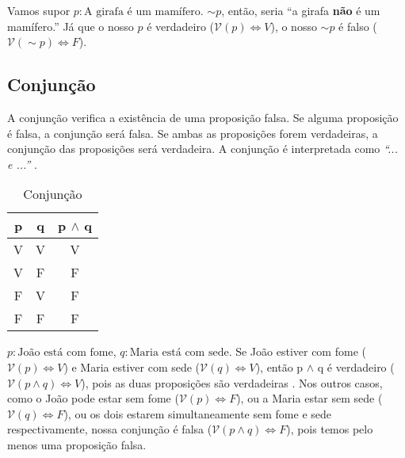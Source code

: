 \begin{exemplo}
Vamos supor $p: \text{A girafa é um mamífero}.$ $\sim p$, então, seria ``a girafa \textbf{não} é um mamífero.'' Já que o nosso $p$ é verdadeiro ($\mathcal{V}(p) \Leftrightarrow V$), o nosso $\sim p$ é falso ($\mathcal{V}(\sim p) \Leftrightarrow F$).
\end{exemplo}

\subsection*{Conjunção}
A conjunção verifica a existência de uma proposição falsa. Se alguma proposição é falsa, a conjunção será falsa. Se ambas as proposições forem verdadeiras, a conjunção das proposições será verdadeira. A conjunção é interpretada como \textit{``... e ...''} .
\begin{table}[H]
\centering
\caption{Conjunção}
\label{and}
\begin{tabular}{c|c|c}
\textbf{p} & \textbf{q} & \textbf{p $\wedge$ q} \\ \hline
V          & V          & V             \\
V          & F          & F             \\
F          & V          & F             \\
F          & F          & F            
\end{tabular}
\end{table}

\begin{exemplo}
$p:\text{João está com fome}$, $q:\text{Maria está com sede}$. Se João estiver com fome ($\mathcal{V}(p) \Leftrightarrow V$) e Maria estiver com sede ($\mathcal{V}(q) \Leftrightarrow V$), então p $\wedge$ q é verdadeiro ($\mathcal{V}(p \wedge q) \Leftrightarrow V$), pois as duas proposições são verdadeiras . Nos outros casos, como o João pode estar sem fome ($\mathcal{V}(p) \Leftrightarrow F$), ou a Maria estar sem sede ($\mathcal{V}(q) \Leftrightarrow F$), ou os dois estarem simultaneamente sem fome e sede respectivamente, nossa conjunção é falsa ($\mathcal{V}(p \wedge q) \Leftrightarrow F$), pois temos pelo menos uma proposição falsa. 
\end{exemplo}


